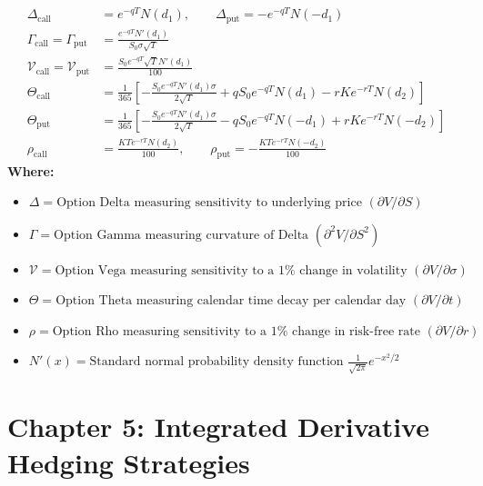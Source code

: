 \begin{formulabox}
\begin{align*}
\Delta_{\text{call}} &= e^{-q T} N(d_1), \qquad \Delta_{\text{put}} = -e^{-q T} N(-d_1) \\
\Gamma_{\text{call}} = \Gamma_{\text{put}} &= \frac{e^{-q T} N'(d_1)}{S_0 \sigma \sqrt{T}} \\
\mathcal{V}_{\text{call}} = \mathcal{V}_{\text{put}} &= \frac{S_0 e^{-q T} \sqrt{T} N'(d_1)}{100} \\
\Theta_{\text{call}} &= \frac{1}{365} \left[ -\frac{S_0 e^{-q T} N'(d_1) \sigma}{2 \sqrt{T}} + q S_0 e^{-q T} N(d_1) - r K e^{-r T} N(d_2) \right] \\
\Theta_{\text{put}} &= \frac{1}{365} \left[ -\frac{S_0 e^{-q T} N'(d_1) \sigma}{2 \sqrt{T}} - q S_0 e^{-q T} N(-d_1) + r K e^{-r T} N(-d_2) \right] \\
\rho_{\text{call}} &= \frac{K T e^{-r T} N(d_2)}{100}, \qquad \rho_{\text{put}} = -\frac{K T e^{-r T} N(-d_2)}{100}
\end{align*}
\textbf{Where:}
\begin{itemize}[leftmargin=1.8em, noitemsep]
    \item $\Delta = \text{Option Delta measuring sensitivity to underlying price } (\partial V / \partial S)$
    \item $\Gamma = \text{Option Gamma measuring curvature of Delta } (\partial^2 V / \partial S^2)$
    \item $\mathcal{V} = \text{Option Vega measuring sensitivity to a } 1\% \text{ change in volatility } (\partial V / \partial \sigma)$
    \item $\Theta = \text{Option Theta measuring calendar time decay per calendar day } (\partial V / \partial t)$
    \item $\rho = \text{Option Rho measuring sensitivity to a } 1\% \text{ change in risk-free rate } (\partial V / \partial r)$
    \item $N'(x) = \text{Standard normal probability density function } \frac{1}{\sqrt{2\pi}} e^{-x^2/2}$
\end{itemize}
\end{formulabox}

\newpage
\section*{Chapter 5: Integrated Derivative Hedging Strategies}

